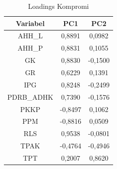 \begin{table}[H]
\centering
\caption{Loadings Kompromi} \label{tab:loadings}
\begin{tabular}{|c|c|c|}
\hline
\textbf{Variabel} & \textbf{PC1} & \textbf{PC2} \\
\hline
AHH\_L & 0,8891 & 0,0982 \\
AHH\_P & 0,8831 & 0,1055 \\
GK & 0,8830 & -0,1500 \\
GR & 0,6229 & 0,1391 \\
IPG & 0,8248 & -0,2499 \\
PDRB\_ADHK & 0,7390 & -0,1576 \\
PKKP & -0,8497 & 0,1062 \\
PPM & -0,8816 & 0,0509 \\
RLS & 0,9538 & -0,0801 \\
TPAK & -0,4764 & -0,4946 \\
TPT & 0,2007 & 0,8620 \\
\hline
\end{tabular}
\end{table}